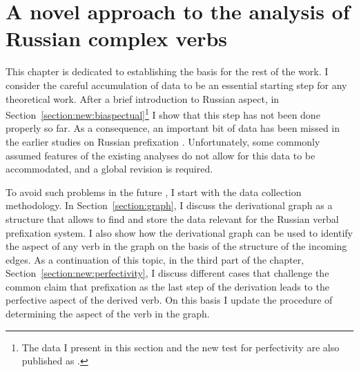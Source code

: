 
\chapter{A novel approach to the analysis of Russian complex verbs } %
\label{Chapter2}
This chapter is dedicated to establishing the basis for the rest of the work. I consider the careful accumulation of data to be an essential starting step for any theoretical work. After a brief introduction to Russian aspect, in Section~\ref{section:new:biaspectual}\footnote{The data I present in this section and the new test for perfectivity  are also published as \citealt{ZinovaFilip:13, ZinovaFilip:14b}.} I show that this step has not been done properly so far. As a consequence, an important bit of data has been missed in the earlier studies on Russian prefixation . Unfortunately, some commonly assumed features of the existing analyses do not allow for this data to be accommodated, and a global revision is required.
 

To avoid such problems in the future , I start with the data collection methodology.
In Section~\ref{section:graph}, I discuss the derivational graph as a structure that allows to find and store the data relevant for the Russian verbal prefixation  system. I also show how the derivational graph can be used to identify the aspect of any verb in the graph on the basis of the structure of the incoming edges. As a continuation of this topic, in the third part of the chapter, Section~\ref{section:new:perfectivity}, I discuss different cases that challenge the common claim that prefixation  as the last step of the derivation leads to the perfective aspect of the derived verb. On this basis I update the procedure of determining the aspect of the verb in the graph.  

